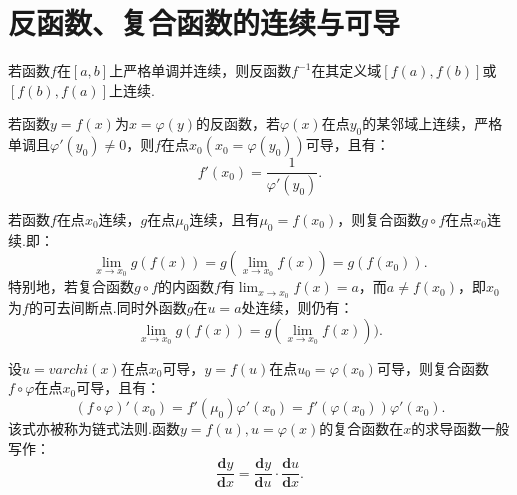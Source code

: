 \section{反函数、复合函数的连续与可导}

\begin{theorem}[反函数的连续性]
	若函数$f$在$[a,b]$上严格单调并连续，则反函数$f^{-1}$在其定义域$[f(a),f(b)]$或$[f(b),f(a)]$上连续.
\end{theorem}
	
\begin{theorem}[反函数的可导性]
	若函数$y=f(x)$为$x=\varphi(y)$的反函数，若$\varphi(x)$在点$y_0$的某邻域上连续，严格单调且$\varphi'(y_0)\neq 0$，则$f$在点$x_0(x_0=\varphi(y_0))$可导，且有：
	\begin{equation}
		f'(x_0) = \dfrac{1}{\varphi'(y_0)}.
	\end{equation}
\end{theorem}

\begin{theorem}[复合函数的连续性]
	若函数$f$在点$x_0$连续，$g$在点$\mu_0$连续，且有$\mu_0=f(x_0)$，则复合函数$g\circ f$在点$x_0$连续.即：
	\begin{equation}
		\displaystyle\lim_{x\to x_0}g(f(x))=g(\displaystyle\lim_{x\to x_0}f(x)) = g(f(x_0)).
	\end{equation}
	特别地，若复合函数$g\circ f$的内函数$f$有$\displaystyle\lim_{x\to x_0}f(x)=a$，而$a\neq f(x_0)$，即$x_0$为$f$的可去间断点.同时外函数$g$在$u=a$处连续，则仍有： 
	\begin{equation}
		\displaystyle\lim_{x\to x_0}g(f(x))=g(\displaystyle\lim_{x\to x_0}f(x))).
	\end{equation}
\end{theorem}


\begin{theorem}[复合函数的可导性]
	设$u=varchi(x)$在点$x_0$可导，$y=f(u)$在点$u_0=\varphi(x_0)$可导，则复合函数$f\circ \varphi$在点$x_0$可导，且有：
	\begin{equation}
		(f\circ\varphi)'(x_0) = f'(\mu_0)\varphi'(x_0) = f'(\varphi(x_0))\varphi'(x_0).
	\end{equation}
	该式亦被称为链式法则.函数$y = f(u),u = \varphi(x)$的复合函数在$x$的求导函数一般写作：
	\begin{equation}
		\dfrac{\textbf{d}y}{\textbf{d}x} = \dfrac{\textbf{d}y}{\textbf{d}u}\cdot\dfrac{\textbf{d}u}{\textbf{d}x}.
	\end{equation}
\end{theorem}


